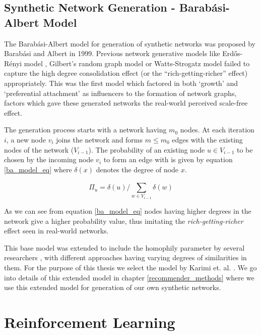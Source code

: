 \subsection{Synthetic Network Generation - Barabási-Albert Model}
\label{ba_model}
The Barabási-Albert model \cite{barabasi1999emergence} for generation of synthetic networks was proposed by Barabási and Albert in 1999. Previous network generative models like Erdős-Rényi model \cite{erdds1959random}, Gilbert's random graph model \cite{gilbert1959random} or Watts-Strogatz model \cite{watts1998collective} failed to capture the high degree consolidation effect (or the ``rich-getting-richer'' effect) appropriately. This was the first model which factored in both `growth' and `preferential attachment' as influencers to the formation of network graphs, factors which gave these generated networks the real-world perceived scale-free effect. 

The generation process starts with a network having $m_{0}$ nodes. At each iteration $i$, a new node $v_{i}$ joins the network and forms $m \leq m_{0}$ edges with the existing nodes of the network ($V_{i-1}$). The probability of an existing node $u \in V_{i-1}$ to be chosen by the incoming node $v_{i}$ to form an edge with is given by equation \ref{ba_model_eq} where $\delta(x)$ denotes the degree of node $x$. 

\begin{equation}
\label{ba_model_eq}
\Pi_{u} = \delta(u) / \sum_{w \in V_{i-1}}^{}\delta(w)
\end{equation}

As we can see from equation \ref{ba_model_eq} nodes having higher degrees in the network give a higher probability value, thus imitating the \textit{rich-getting-richer} effect seen in real-world networks. 

This base model was extended to include the homophily parameter by several researchers \cite{karimi2018homophily,de2013scale,avin2015homophily}, with different approaches having varying degrees of similarities in them. For the purpose of this thesis we select the model by Karimi et. al. \cite{karimi2018homophily}. We go into details of this extended model in chapter \ref{recommender_methods} where we use this extended model for generation of our own synthetic networks.

\section{Reinforcement Learning}

